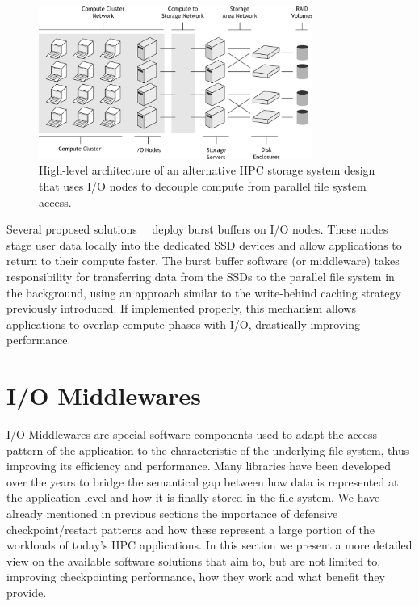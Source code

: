 \begin{figure}[!htb]
\centering
\includegraphics[width=0.8\textwidth]{figures/hpc-io-nodes}
\caption{High-level architecture of an alternative HPC storage system design that uses I/O nodes to decouple compute from parallel file system access.}
\label{figure: hpc-io-nodes}
\end{figure}

Several proposed solutions~\cite{Liu2012}~\cite{Wang2014} deploy burst buffers on I/O nodes. These nodes stage user data locally into the dedicated SSD devices and allow applications to return to their compute faster. 
The burst buffer software (or middleware) takes responsibility for transferring data from the SSDs to the parallel file system in the background, using an approach similar to the write-behind caching strategy previously 
introduced. If implemented properly, this mechanism allows applications to overlap compute phases with I/O, drastically improving performance.

\section{I/O Middlewares}\label{section: middlewares}
I/O Middlewares are special software components used to adapt the access pattern of the application to the characteristic of the underlying file system, thus improving its efficiency and performance. Many libraries
have been developed over the years to bridge the semantical gap between how data is represented at the application level and how it is finally stored in the file system. We have already mentioned in previous sections
the importance of defensive checkpoint/restart patterns and how these represent a large portion of the workloads of today's HPC applications. In this section we present a more detailed view on the available software
solutions that aim to, but are not limited to, improving checkpointing performance, how they work and what benefit they provide.


